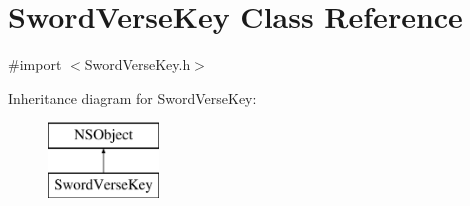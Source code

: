 \hypertarget{interface_sword_verse_key}{\section{Sword\-Verse\-Key Class Reference}
\label{interface_sword_verse_key}
}


{\ttfamily \#import $<$Sword\-Verse\-Key.\-h$>$}

Inheritance diagram for Sword\-Verse\-Key\-:\begin{figure}[H]
\begin{center}
\leavevmode
\includegraphics[height=2.000000cm]{interface_sword_verse_key}
\end{center}
\end{figure}
